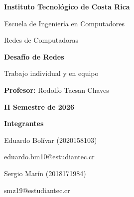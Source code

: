 \documentclass[12pt,a4paper]{article}
\begin{document}

\begin{titlepage}
    \centering
    \singlespacing
    \thispagestyle{empty}

    {\Large\bfseries Instituto Tecnológico de Costa Rica\par}

    \vspace{0.3cm}

    {\large Escuela de Ingeniería en Computadores\par}

    \vspace{0.3cm}

    {\large Redes de Computadoras\par}

    \vspace{2cm}

    {\LARGE\bfseries Desafío de Redes\par}

    \vspace{0.4cm}

    {\large Trabajo individual y en equipo\par}

    \vspace{1.5cm}

    \textbf{Profesor:} Rodolfo Tacsan Chaves\par

    \vspace{0.3cm}

    \textbf{II Semestre de 2026}\par

    \vspace{1.5cm}

    {\large\bfseries Integrantes\par}

    \vspace{0.6cm}

    Eduardo Bolívar (2020158103)\\
    {\small eduardo.bm10@estudiantec.cr\par}

    \vspace{0.4cm}

    Sergio Marín (2018171984)\\
    {\small smz19@estudiantec.cr\par}


\end{titlepage}
\end{document}
